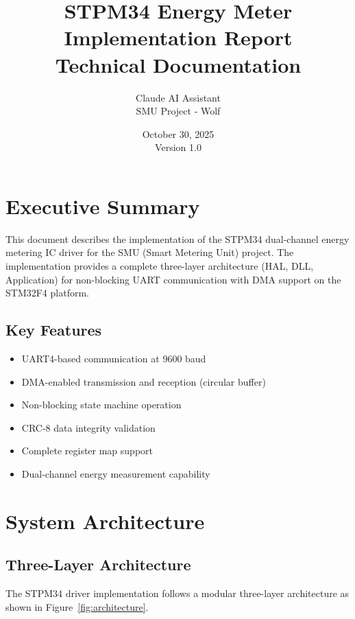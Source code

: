 \documentclass[11pt,a4paper]{article}
\title{\textbf{STPM34 Energy Meter Implementation Report}\\
\large Technical Documentation}
\author{Claude AI Assistant\\
SMU Project - Wolf}
\date{October 30, 2025\\
Version 1.0}
\begin{document}
\maketitle
\thispagestyle{empty}

\newpage

\tableofcontents

\newpage

\section{Executive Summary}

This document describes the implementation of the STPM34 dual-channel energy metering IC driver for the SMU (Smart Metering Unit) project. The implementation provides a complete three-layer architecture (HAL, DLL, Application) for non-blocking UART communication with DMA support on the STM32F4 platform.

\subsection{Key Features}

\begin{itemize}[noitemsep]
    \item UART4-based communication at 9600 baud
    \item DMA-enabled transmission and reception (circular buffer)
    \item Non-blocking state machine operation
    \item CRC-8 data integrity validation
    \item Complete register map support
    \item Dual-channel energy measurement capability
\end{itemize}

\section{System Architecture}

\subsection{Three-Layer Architecture}

The STPM34 driver implementation follows a modular three-layer architecture as shown in Figure~\ref{fig:architecture}.
\end{document}
